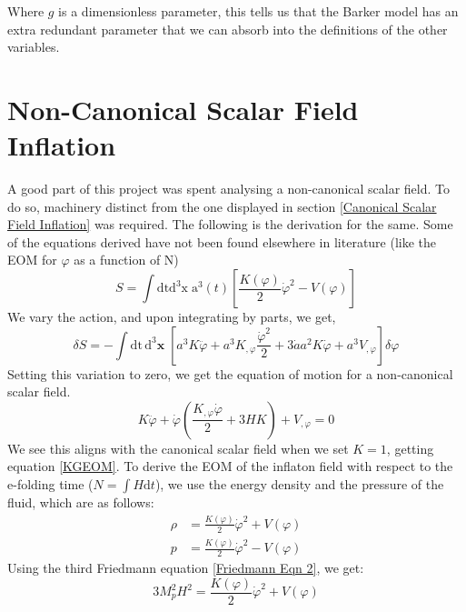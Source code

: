 \documentclass[aps,prd,reprint,preprintnumbers,showpacs,floatfix,nofootinbib,superscript address]{revtex4-2}
\begin{document}
Where $g$ is a dimensionless parameter, this tells us that the Barker model has an extra redundant parameter that we can absorb into the definitions of the other variables.
\section{Non-Canonical Scalar Field Inflation} \label{Non-Canonical Scalar Field Inflation}

A good part of this project was spent analysing a non-canonical scalar field. To do so, machinery distinct from the one displayed in section \ref{Canonical Scalar Field Inflation} was required. The following is the derivation for the same. Some of the equations derived have not been found elsewhere in literature (like the EOM for $\varphi$ as a function of N)
\begin{equation} \label{13}
    S = \int \text{dt}\text{d}^3\text{x} \; \text{a}^3(t) \left[ \frac{K(\varphi)}{2}\dot{\varphi}^2 - V(\varphi) \right]
\end{equation}
We vary the action, and upon integrating by parts, we get,
\begin{equation}
    \delta S = - \int \text{dt}\,\text{d}^3\textbf{x} \; \left[ a^3 K \ddot{\varphi} + a^3K_{,\varphi} \frac{\dot{\varphi}^2}{2}  +  3\dot{a} a^2 K \dot{\varphi} + a^3V_{,\varphi}  \right]\delta \varphi
\end{equation}
Setting this variation to zero, we get the equation of motion for a non-canonical scalar field.
\begin{equation} \label{16}
    K \ddot{\varphi} + \dot{\varphi} \left(\frac{K_{,\varphi} \dot{\varphi}}{2} + 3H K \right) + V_{,\varphi}   = 0
\end{equation}
We see this aligns with the canonical scalar field when we set $K = 1$, getting equation \ref{KGEOM}. To derive the EOM of the inflaton field with respect to the e-folding time ($N = \int H \text{d}t$), we use the energy density and the pressure of the fluid, which are as follows: 
\begin{align}   \label{18}
    \rho &= \frac{K(\varphi)}{2} \dot{\varphi}^2 + V(\varphi) \nonumber \\
    p &= \frac{K(\varphi)}{2} \dot{\varphi}^2 - V(\varphi)
\end{align}
Using the third Friedmann equation \ref{Friedmann Eqn 2}, we get:
\begin{equation}    \label{19}
    3 M_p^2H^2 = \frac{K(\varphi)}{2} \dot{\varphi}^2 + V(\varphi)
\end{equation}
\end{document}
